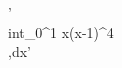 \documentclass[preview]{standalone}
\begin{document}
\begin{center}
'\\int_{0}^{1} x(x-1)^4 \\,dx'
\end{center}
\end{document}
